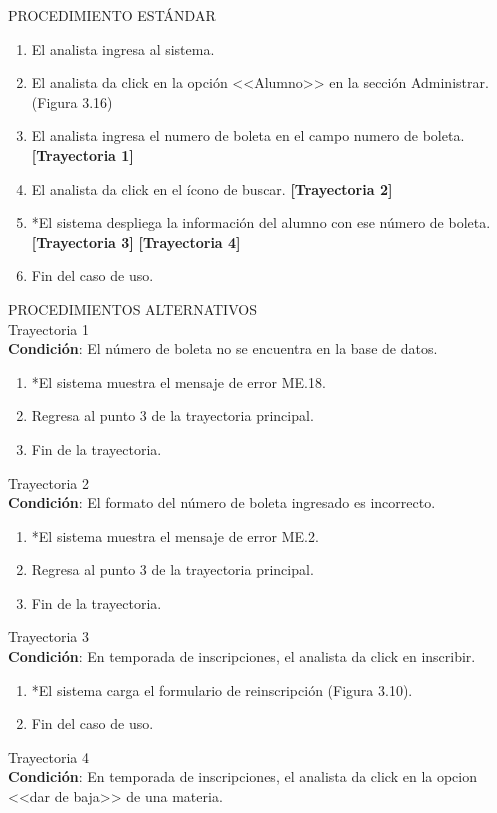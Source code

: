 \noindent
\Large{PROCEDIMIENTO ESTÁNDAR}
\large{}
\begin{enumerate}
    \item El analista ingresa al sistema.
    \item El analista da click en la opción <<Alumno>> en la sección Administrar. (Figura 3.16)
    \item El analista ingresa el numero de boleta en el campo numero de boleta. \textbf{[Trayectoria 1]}
    \item El analista da click en el ícono de buscar. \textbf{[Trayectoria 2]}
    \item *El sistema despliega la información del alumno con ese número de boleta. \textbf{[Trayectoria 3]} \textbf{[Trayectoria 4]}
    \item Fin del caso de uso.
\end{enumerate}
\vspace*{1cm}
\Large{PROCEDIMIENTOS ALTERNATIVOS}\\
\large{Trayectoria 1}\\
\textbf{Condición}: El número de boleta no se encuentra en la base de datos.
\begin{enumerate}
    \item *El sistema muestra el mensaje de error ME.18.
    \item Regresa al punto 3 de la trayectoria principal.
    \item Fin de la trayectoria.
\end{enumerate}
\large{Trayectoria 2}\\
\textbf{Condición}: El formato del número de boleta ingresado es incorrecto.
\begin{enumerate}
    \item *El sistema muestra el mensaje de error ME.2.
    \item Regresa al punto 3 de la trayectoria principal.
    \item Fin de la trayectoria.
\end{enumerate}
\large{Trayectoria 3}\\
\textbf{Condición}: En temporada de inscripciones, el analista da click en inscribir.
\begin{enumerate}
    \item *El sistema carga el formulario de reinscripción (Figura 3.10).
    \item Fin del caso de uso.
\end{enumerate}
\large{Trayectoria 4}\\
\textbf{Condición}: En temporada de inscripciones, el analista da click en la opcion <<dar de baja>> de una materia.
